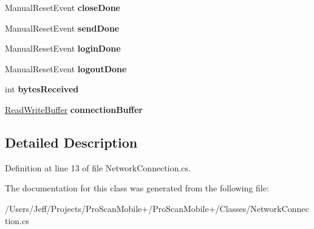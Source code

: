 \begin{DoxyCompactItemize}
\item 
\hypertarget{class_pro_scan_mobile_1_1_network_connection_af35886fc3bfcc83da9ef3571d99fa91c}{Manual\-Reset\-Event {\bfseries close\-Done}}\label{class_pro_scan_mobile_1_1_network_connection_af35886fc3bfcc83da9ef3571d99fa91c}

\item 
\hypertarget{class_pro_scan_mobile_1_1_network_connection_aef0cbb620096d9dadb94b6a28c3ab442}{Manual\-Reset\-Event {\bfseries send\-Done}}\label{class_pro_scan_mobile_1_1_network_connection_aef0cbb620096d9dadb94b6a28c3ab442}

\item 
\hypertarget{class_pro_scan_mobile_1_1_network_connection_a8fa14c62a4f4ebc6103e69b90ab70c69}{Manual\-Reset\-Event {\bfseries login\-Done}}\label{class_pro_scan_mobile_1_1_network_connection_a8fa14c62a4f4ebc6103e69b90ab70c69}

\item 
\hypertarget{class_pro_scan_mobile_1_1_network_connection_acc628750f6cd703fca049defa5c64efa}{Manual\-Reset\-Event {\bfseries logout\-Done}}\label{class_pro_scan_mobile_1_1_network_connection_acc628750f6cd703fca049defa5c64efa}

\item 
\hypertarget{class_pro_scan_mobile_1_1_network_connection_a30cce36c9657e0c5baa474ed4bb22ada}{int {\bfseries bytes\-Received}}\label{class_pro_scan_mobile_1_1_network_connection_a30cce36c9657e0c5baa474ed4bb22ada}

\item 
\hypertarget{class_pro_scan_mobile_1_1_network_connection_a9c33fc95940f4a241c88e39e37882be1}{\hyperlink{class_pro_scan_mobile_1_1_read_write_buffer}{Read\-Write\-Buffer} {\bfseries connection\-Buffer}}\label{class_pro_scan_mobile_1_1_network_connection_a9c33fc95940f4a241c88e39e37882be1}

\end{DoxyCompactItemize}


\subsection{Detailed Description}


Definition at line 13 of file Network\-Connection.\-cs.



The documentation for this class was generated from the following file\-:\begin{DoxyCompactItemize}
\item 
/\-Users/\-Jeff/\-Projects/\-Pro\-Scan\-Mobile+/\-Pro\-Scan\-Mobile+/\-Classes/Network\-Connection.\-cs\end{DoxyCompactItemize}
